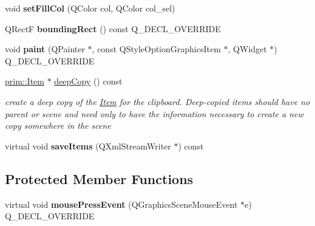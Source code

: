 \begin{DoxyCompactItemize}
\item 
void {\bfseries set\+Fill\+Col} (Q\+Color col, Q\+Color col\+\_\+sel)\hypertarget{classprim_1_1DBDot_a7808bfd2be17d3ef52f950d877bda4b1}{}\label{classprim_1_1DBDot_a7808bfd2be17d3ef52f950d877bda4b1}

\item 
Q\+RectF {\bfseries bounding\+Rect} () const Q\+\_\+\+D\+E\+C\+L\+\_\+\+O\+V\+E\+R\+R\+I\+DE\hypertarget{classprim_1_1DBDot_a4ee820c9566c8de80bd41456cb1c1461}{}\label{classprim_1_1DBDot_a4ee820c9566c8de80bd41456cb1c1461}

\item 
void {\bfseries paint} (Q\+Painter $\ast$, const Q\+Style\+Option\+Graphics\+Item $\ast$, Q\+Widget $\ast$) Q\+\_\+\+D\+E\+C\+L\+\_\+\+O\+V\+E\+R\+R\+I\+DE\hypertarget{classprim_1_1DBDot_add84a5f6ceecb3312d4f7f9501528ce6}{}\label{classprim_1_1DBDot_add84a5f6ceecb3312d4f7f9501528ce6}

\item 
\hyperlink{classprim_1_1Item}{prim\+::\+Item} $\ast$ \hyperlink{classprim_1_1DBDot_ac362bbff76cb0537708bbd43fb189114}{deep\+Copy} () const \hypertarget{classprim_1_1DBDot_ac362bbff76cb0537708bbd43fb189114}{}\label{classprim_1_1DBDot_ac362bbff76cb0537708bbd43fb189114}

\begin{DoxyCompactList}\small\item\em create a deep copy of the \hyperlink{classprim_1_1Item}{Item} for the clipboard. Deep-\/copied items should have no parent or scene and need only to have the information necessary to create a new copy somewhere in the scene \end{DoxyCompactList}\item 
virtual void {\bfseries save\+Items} (Q\+Xml\+Stream\+Writer $\ast$) const \hypertarget{classprim_1_1DBDot_a8cff2080b4b633bafe0aed9012b9325c}{}\label{classprim_1_1DBDot_a8cff2080b4b633bafe0aed9012b9325c}

\end{DoxyCompactItemize}
\subsection*{Protected Member Functions}
\begin{DoxyCompactItemize}
\item 
virtual void {\bfseries mouse\+Press\+Event} (Q\+Graphics\+Scene\+Mouse\+Event $\ast$e) Q\+\_\+\+D\+E\+C\+L\+\_\+\+O\+V\+E\+R\+R\+I\+DE\hypertarget{classprim_1_1DBDot_a9c7a8a7aeb3a1b312e4d4c5b0cb10934}{}\label{classprim_1_1DBDot_a9c7a8a7aeb3a1b312e4d4c5b0cb10934}

\end{DoxyCompactItemize}
